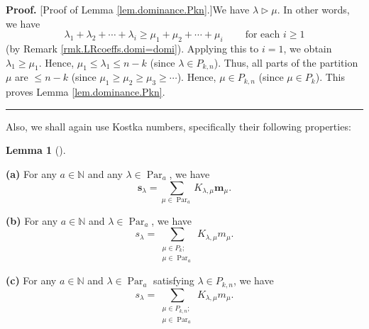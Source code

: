 \documentclass[numbers=enddot,12pt,final,onecolumn,notitlepage]{scrartcl}%
\theoremstyle{definition}
\newtheorem{lem}[theo]{Lemma}
\newenvironment{lemma}[1][]
{\begin{lem}[#1]\begin{leftbar}}
{\end{leftbar}\end{lem}}
\newenvironment{proof}[1][Proof]{\noindent\textbf{#1.} }{\ \rule{0.5em}{0.5em}}
\let\sumnonlimits\sum
\renewcommand{\sum}{\sumnonlimits\limits}
\begin{document}
\begin{proof}
[Proof of Lemma \ref{lem.dominance.Pkn}.]We have $\lambda\triangleright\mu$.
In other words, we have
\[
\lambda_{1}+\lambda_{2}+\cdots+\lambda_{i}\geq\mu_{1}+\mu_{2}+\cdots+\mu
_{i}\ \ \ \ \ \ \ \ \ \ \text{for each }i\geq1
\]
(by Remark \ref{rmk.LRcoeffs.domi=domi}). Applying this to $i=1$, we obtain
$\lambda_{1}\geq\mu_{1}$. Hence, $\mu_{1}\leq\lambda_{1}\leq n-k$ (since
$\lambda\in P_{k,n}$). Thus, all parts of the partition $\mu$ are $\leq n-k$
(since $\mu_{1}\geq\mu_{2}\geq\mu_{3}\geq\cdots$). Hence, $\mu\in P_{k,n}$
(since $\mu\in P_{k}$). This proves Lemma \ref{lem.dominance.Pkn}.
\end{proof}

Also, we shall again use Kostka numbers, specifically their following properties:

\begin{lemma}
\label{lem.kostka.m}\textbf{(a)} For any $a\in\mathbb{N}$ and any $\lambda
\in\operatorname*{Par}\nolimits_{a}$, we have%
\[
\mathbf{s}_{\lambda}=\sum_{\mu\in\operatorname*{Par}\nolimits_{a}}%
K_{\lambda,\mu}\mathbf{m}_{\mu}.
\]


\textbf{(b)} For any $a\in\mathbb{N}$ and $\lambda\in\operatorname*{Par}%
\nolimits_{a}$, we have%
\[
s_{\lambda}=\sum_{\substack{\mu\in P_{k};\\\mu\in\operatorname*{Par}%
\nolimits_{a}}}K_{\lambda,\mu}m_{\mu}.
\]


\textbf{(c)} For any $a\in\mathbb{N}$ and $\lambda\in\operatorname*{Par}%
\nolimits_{a}$ satisfying $\lambda\in P_{k,n}$, we have%
\[
s_{\lambda}=\sum_{\substack{\mu\in P_{k,n};\\\mu\in\operatorname*{Par}%
\nolimits_{a}}}K_{\lambda,\mu}m_{\mu}.
\]

\end{lemma}
\end{document}
